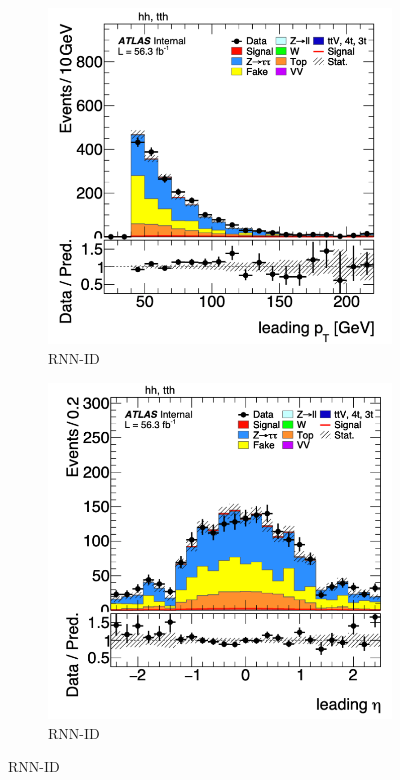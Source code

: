 \begin{figure}[htbp]
    \begin{subfigure}[b]{0.45\textwidth}
        \centering
        \includegraphics[width=\textwidth]{images/leading_pt_gntau.png}
        \caption{RNN-ID}
    \end{subfigure}
    \begin{subfigure}[b]{0.45\textwidth}
        \centering
        \includegraphics[width=\textwidth]{images/leading_eta_gntau.png}
        \caption{RNN-ID}
    \end{subfigure}


\end{figure}
